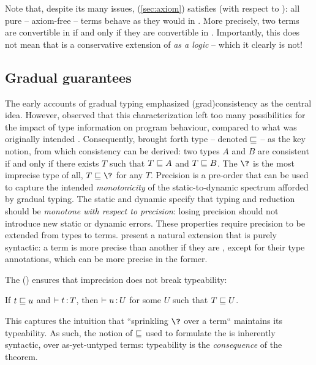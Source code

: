 Note that, despite its many issues,  (\cref{sec:axiom}) satisfies
 (with respect to ):
all pure – \ie axiom-free –  terms behave as they would in .
More precisely, two  terms are convertible in 
if and only if they are convertible in .
Importantly, this does not mean that  is a conservative extension of
 \emph{as a logic} – which it clearly is not!

\subsection{Gradual guarantees}
\AP The early accounts of gradual typing emphasized \kl(grad){consistency} as the central idea.
However,  observed that this characterization left too many
possibilities for the impact of type information on program behaviour,
compared to what was originally intended .
%
Consequently, \textcite{Siek2015} brought forth type  – denoted $\sqsubseteq$ –
as the key notion, from which consistency can be derived: two types $A$ and $B$
are consistent if and only if there exists $T$ such that $T \sqsubseteq A$ and $T \sqsubseteq B$.
The  $\?$ is the most imprecise type of all,
\ie $T \pre \?$ for any $T$.
%
Precision is a pre-order that can be used to capture the intended \emph{monotonicity} of
the static-to-dynamic spectrum afforded by gradual typing.
The static and dynamic  specify that typing
and reduction should be \emph{monotone with respect to precision}:
losing precision should not introduce new static or dynamic errors.
%
These properties require precision to be extended from types to terms.
\textcite{Siek2015} present a natural extension that is purely syntactic:
a term is more precise than another if they are , except
for their type annotations, which can be more precise in the former.

\AP The  ()
ensures that imprecision does not break typeability:

\begin{minipage}{\textwidth}
\begin{property}
If $t \sqsubseteq u$ and $\vdash t \operatorname{:} T$, then $\vdash u \operatorname{:} U$
for some $U$ such that $T \sqsubseteq U$.
\end{property}  
\end{minipage}

%
This  captures the intuition that “sprinkling $\?$ over a term“
maintains its typeability. As such, the notion of  $\sqsubseteq$ used to
formulate the  is inherently syntactic,
over as-yet-untyped terms: typeability is the \emph{consequence} of the  theorem.

